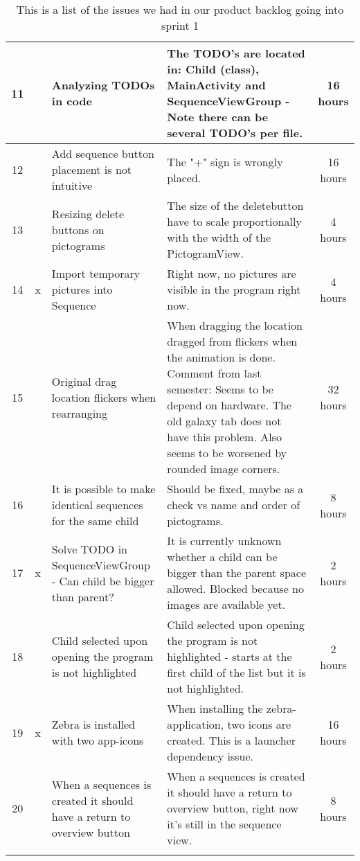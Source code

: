 \begin{longtable} { | c | c | p{5cm} | p{5cm} | c | }
	11	& 		&	Analyzing TODOs in code	&	The TODO's are located in: Child (class), MainActivity and SequenceViewGroup - Note there can be several TODO's per file.		&	16 hours	\\\hline
	12	& 		&	Add sequence button placement is not intuitive	&	The "+" sign is wrongly placed.	&	16 hours 	\\\hline
	13	& 		&	Resizing delete buttons on pictograms	&	The size of the deletebutton have to scale proportionally with the width of the PictogramView.	&	4 hours	\\\hline
	14	& 	x	&	Import temporary pictures into Sequence	&	Right now, no pictures are visible in the program right now.	&	4 hours	\\\hline
	15	& 		&	Original drag location flickers when rearranging	&	When dragging the location dragged from flickers when the animation is done. Comment from last semester: Seems to be depend on hardware. The old galaxy tab does not have this problem. Also seems to be worsened by rounded image corners.	&	32 hours 	\\\hline
	16	& 		&	It is possible to make identical sequences for the same child	&	Should be fixed, maybe as a check vs name and order of pictograms.	&	8 hours	\\\hline
	17	& 	x	&	Solve TODO in SequenceViewGroup - Can child be bigger than parent?	&	It is currently unknown whether a child can be bigger than the parent space allowed. Blocked because no images are available yet.	&	2 hours	\\\hline
	18	& 		&	Child selected upon opening the program is not highlighted	&	Child selected upon opening the program is not highlighted - starts at the first child of the list but it is not highlighted.	&	2 hours	\\\hline
	19	& 	x	&	Zebra is installed with two app-icons	&	When installing the zebra-application, two icons are created. This is a launcher dependency issue.	&	16 hours\\\hline
	20	& 		&	When a sequences is created it should have a return to overview button	&	When a sequences is created it should have a return to overview button, right now it's still in the sequence view.	&	8 hours\\\hline
\caption{This is a list of the issues we had in our product backlog going into sprint 1}
\label{tab:spr1_prodblog}
\end{longtable}

